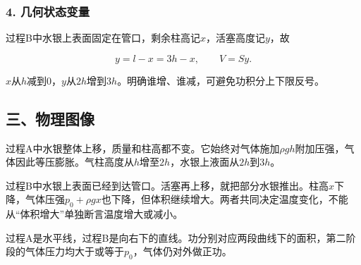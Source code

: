 \documentclass[12pt,a4paper,fontset=fandol]{ctexart}
\begin{document}
\subsubsection{4.
几何状态变量}\label{ux51e0ux4f55ux72b6ux6001ux53d8ux91cf}

过程B中水银上表面固定在管口，剩余柱高记\(x\)，活塞高度记\(y\)，故

\[
y=l-x=3h-x,\qquad V=Sy.
\]

\(x\)从\(h\)减到0，\(y\)从\(2h\)增到\(3h\)。明确谁增、谁减，可避免功积分上下限反号。

\subsection{三、物理图像}\label{ux4e09ux7269ux7406ux56feux50cf-1}

过程A中水银整体上移，质量和柱高都不变。它始终对气体施加\(\rho gh\)附加压强，气体因此等压膨胀。气柱高度从\(h\)增至\(2h\)，水银上液面从\(2h\)到\(3h\)。

过程B中水银上表面已经到达管口。活塞再上移，就把部分水银推出。柱高\(x\)下降，气体压强\(p_0+\rho gx\)也下降，但体积继续增大。两者共同决定温度变化，不能从``体积增大''单独断言温度增大或减小。

\begin{center}
\begin{minipage}{\linewidth}
\centering\begingroup{}
\ifdim\wd\diagrambox>.88\linewidth
\sbox{\diagrambox}{\resizebox{.88\linewidth}{!}{\usebox{\diagrambox}}}\fi
\ifdim\ht\diagrambox>.38\textheight
\resizebox{!}{.38\textheight}{\usebox{\diagrambox}}
\else\usebox{\diagrambox}\fi
\par{}\endgroup\end{minipage}\end{center}

过程A是水平线，过程B是向右下的直线。功分别对应两段曲线下的面积，第二阶段的气体压力均大于或等于\(p_0\)，气体仍对外做正功。
\end{document}
